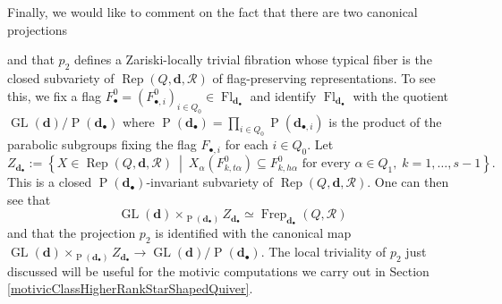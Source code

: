 \documentclass{amsart}
\theoremstyle{plain}
\numberwithin{equation}{section}
\theoremstyle{definition}
\theoremstyle{remark}
\begin{document}
	\\
	\\
	Finally, we would like to comment on the fact that there are two canonical projections 
	\begin{center}
	\end{center}
	and that $p_2$ defines a Zariski-locally trivial fibration whose typical fiber is the closed subvariety of $\operatorname{Rep}(Q,\mathbf{d},\mathcal{R})$ of flag-preserving representations. To see this, we fix a flag $F_\bullet^0	=
	(F_{\bullet,i}^0)_{i\in Q_0} \in \operatorname{Fl}_{\mathbf d_\bullet}$ and identify $\operatorname{Fl}_{\mathbf{d}_\bullet}$ with the quotient $\operatorname{GL}(\mathbf{d})/\operatorname{P}(\mathbf{d}_\bullet)$ where $\operatorname{P}(\mathbf{d}_\bullet)=\prod_{i\in Q_0}\operatorname{P}(\mathbf{d}_{\bullet,i})$ is the product of the parabolic subgroups fixing the flag $F_{\bullet,i}$ for each $i\in Q_0$. Let
	$$
	Z_{\mathbf d_\bullet}
	:=
	\left\{ X\in\operatorname{Rep}(Q,\mathbf d,\mathcal R)
	\ \middle|\
	X_\alpha(F_{k,t\alpha}^0)
	\subseteq
	F_{k,h\alpha}^0
	\text{ for every }
	\alpha\in Q_1,\;
	k=1,\ldots,s-1\right\}.
	$$
	This is a closed $\operatorname{P}(\mathbf{d}_\bullet)$-invariant subvariety of $\operatorname{Rep}(Q,\mathbf d,\mathcal R)$. One can then see that
	$$
	\operatorname{GL}(\mathbf{d})\times_{\operatorname{P}(\mathbf{d}_\bullet)}Z_{\mathbf{d}_{\bullet}}\simeq \operatorname{Frep}_{\mathbf{d}_\bullet}(Q,\mathcal{R})
	$$
	and that the projection $p_2$ is identified with the canonical map $	\operatorname{GL}(\mathbf{d})\times_{\operatorname{P}(\mathbf{d}_\bullet)}Z_{\mathbf{d}_{\bullet}}\to \operatorname{GL}(\mathbf{d})/\operatorname{P}(\mathbf{d}_\bullet)$. The local triviality of $p_2$ just discussed will be useful for the motivic computations we carry out in Section \ref{motivicClassHigherRankStarShapedQuiver}. 
\end{document}
